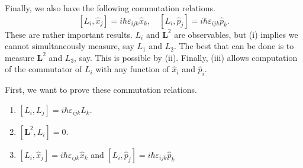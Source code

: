 \documentclass[a4paper]{article}
\begin{document}
Finally, we also have the following commutation relations.
\[
  [L_i, \hat{x}_j] = i\hbar \varepsilon_{ijk} \hat{x}_k,\quad [L_i, \hat{p}_j] = i\hbar \varepsilon_{ijk} \hat{p}_k.\tag{iii}
\]
These are rather important results. $L_i$ and $\mathbf{L}^2$ are observables, but (i) implies we cannot simultaneously measure, say $L_1$ and $L_2$. The best that can be done is to measure $\mathbf{L}^2$ and $L_3$, say. This is possible by (ii). Finally, (iii) allows computation of the commutator of $L_i$ with any function of $\hat{x}_i$ and $\hat{p}_i$.

First, we want to prove these commutation relations.
\begin{prop}\leavevmode
  \begin{enumerate}
    \item $[L_i, L_j] = i\hbar \varepsilon_{ijk} L_k$.
    \item $[\mathbf{L}^2, L_i] = 0$.
    \item $[L_i, \hat{x}_j] = i\hbar \varepsilon_{ijk} \hat{x}_k$ and $[L_i, \hat{p}_j] = i\hbar \varepsilon_{ijk} \hat{p}_k$
  \end{enumerate}
\end{prop}
\end{document}

